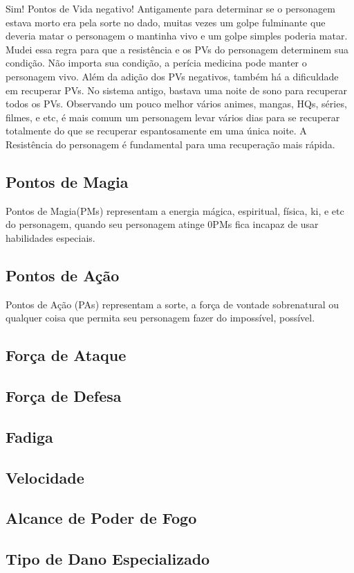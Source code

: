 \begin{framed}
Sim! Pontos de Vida negativo! Antigamente para determinar se o personagem estava morto era pela sorte no dado, muitas vezes um golpe fulminante que deveria matar o personagem o mantinha vivo e um golpe simples poderia matar. Mudei essa regra para que a resistência e os PVs do personagem determinem sua condição. Não importa sua condição, a perícia medicina pode manter o personagem vivo.
Além da adição dos PVs negativos, também há a dificuldade em recuperar PVs. No sistema antigo, bastava uma noite de sono para recuperar todos os PVs. Observando um pouco melhor vários animes, mangas, HQs, séries, filmes, e etc, é mais comum um personagem levar vários dias para se recuperar totalmente do que se recuperar espantosamente em uma única noite. A Resistência do personagem é fundamental para uma recuperação mais rápida.  
\end{framed}

\subsection{Pontos de Magia}

Pontos de Magia(PMs) representam a energia mágica, espiritual, física, ki, e etc do personagem, quando seu personagem atinge 0PMs fica incapaz de usar habilidades especiais.

\subsection{Pontos de Ação}

Pontos de Ação (PAs) representam a sorte, a força de vontade sobrenatural ou qualquer coisa que permita seu personagem fazer do impossível, possível.

\subsection{Força de Ataque}

\subsection{Força de Defesa}

\subsection{Fadiga}

\subsection{Velocidade}

\subsection{Alcance de Poder de Fogo}

\subsection{Tipo de Dano Especializado}
